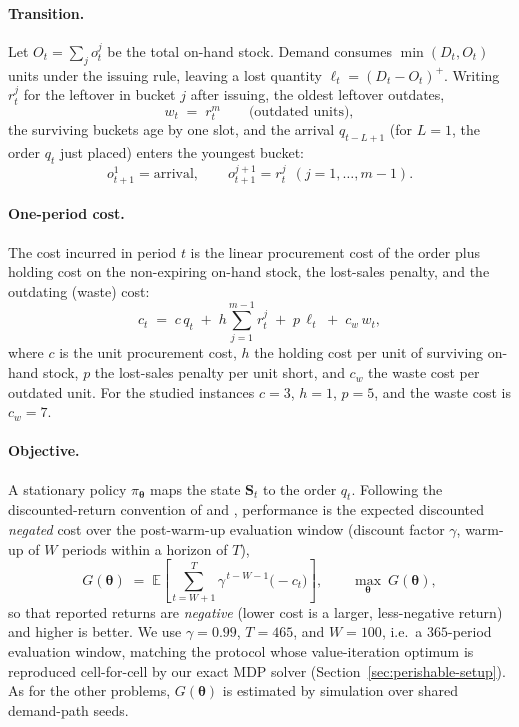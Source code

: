 \documentclass[11pt]{article}
\newcommand{\btheta}{\boldsymbol{\theta}}
\begin{document}
\paragraph{Transition.}
Let $O_t=\sum_{j}o^{j}_t$ be the total on-hand stock. Demand consumes $\min(D_t,O_t)$ units under the
issuing rule, leaving a lost quantity $\ell_t=(D_t-O_t)^+$. Writing $r^{j}_t$ for the leftover in
bucket $j$ after issuing, the oldest leftover outdates,
\begin{equation*}
    w_t \;=\; r^{m}_t \qquad\text{(outdated units)},
\end{equation*}
the surviving buckets age by one slot, and the arrival $q_{t-L+1}$ (for $L=1$, the order $q_t$ just
placed) enters the youngest bucket:
\begin{equation*}
    o^{1}_{t+1}=\text{arrival},\qquad o^{j+1}_{t+1}=r^{j}_t\ \ (j=1,\dots,m-1).
\end{equation*}

\paragraph{One-period cost.}
The cost incurred in period $t$ is the linear procurement cost of the order plus holding cost on the
non-expiring on-hand stock, the lost-sales penalty, and the outdating (waste) cost:
\begin{equation}
    \label{eq:perish-cost}
    c_t \;=\; c\,q_t \;+\; h\sum_{j=1}^{m-1} r^{j}_t \;+\; p\,\ell_t \;+\; c_w\,w_t ,
\end{equation}
where $c$ is the unit procurement cost, $h$ the holding cost per unit of surviving on-hand stock, $p$
the lost-sales penalty per unit short, and $c_w$ the waste cost per outdated unit. For the studied
instances $c=3$, $h=1$, $p=5$, and the waste cost is $c_w=7$.

\paragraph{Objective.}
A stationary policy $\pi_{\btheta}$ maps the state $\mathbf{S}_t$ to the order $q_t$. Following the
discounted-return convention of \citet{deMoor2022perishable} and \citet{farrington2025perishable},
performance is the expected discounted \emph{negated} cost over the post-warm-up evaluation window
(discount factor $\gamma$, warm-up of $W$ periods within a horizon of $T$),
\begin{equation}
    \label{eq:perish-objective}
    G(\btheta) \;=\; \mathbb{E}\!\left[\sum_{t=W+1}^{T}\gamma^{\,t-W-1}\bigl(-c_t\bigr)\right],
    \qquad \max_{\btheta}\ G(\btheta),
\end{equation}
so that reported returns are \emph{negative} (lower cost is a larger, less-negative return) and higher
is better. We use $\gamma=0.99$, $T=465$, and $W=100$, i.e.\ a $365$-period evaluation window,
matching the protocol whose value-iteration optimum is reproduced cell-for-cell by our exact
MDP solver (Section~\ref{sec:perishable-setup}). As for the other problems, $G(\btheta)$ is estimated by
simulation over shared demand-path seeds.
\end{document}
